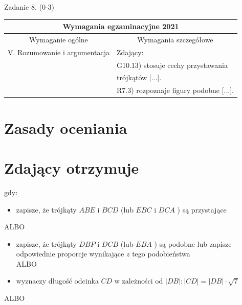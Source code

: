 \documentclass[10pt]{article}
\begin{document}
Zadanie 8. (0-3)

\begin{center}
\begin{tabular}{|l|l|}
\hline
\multicolumn{2}{|c|}{Wymagania egzaminacyjne 2021} \\
\hline
\multicolumn{1}{|c|}{Wymaganie ogólne} & \multicolumn{1}{|c|}{Wymagania szczegółowe} \\
\hline
V. Rozumowanie i argumentacja & Zdający: \\
 & G10.13) stosuje cechy przystawania \\
 & trójkątów [...]. \\
 & R7.3) rozpoznaje figury podobne [...]. \\
\hline
\end{tabular}
\end{center}

\section*{Zasady oceniania}
\section*{Zdający otrzymuje}
gdy:

\begin{itemize}
  \item zapisze, że trójkąty $A B E$ i $B C D$ (lub $E B C$ i $D C A$ ) są przystające
\end{itemize}

ALBO

\begin{itemize}
  \item zapisze, że trójkąty $D B P$ i $D C B$ (lub $E B A$ ) są podobne lub zapisze odpowiednie proporcje wynikające $z$ tego podobieństwa\\
ALBO
  \item wyznaczy długość odcinka $C D$ w zależności od $|D B|:|C D|=|D B| \cdot \sqrt{7}$
\end{itemize}

ALBO
\end{document}
